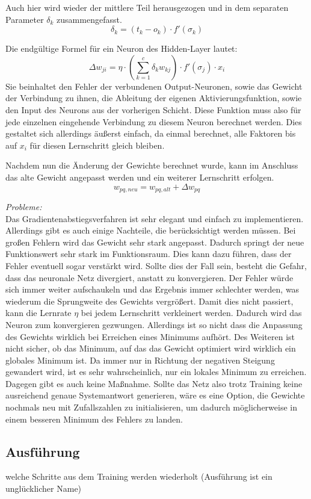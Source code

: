 Auch hier wird wieder der mittlere Teil herausgezogen und in dem separaten Parameter $\delta_k$ zusammengefasst.
\begin{equation}
\delta_k = (t_k-o_k)\cdot f'(\sigma_k)
\end{equation}

Die endgültige Formel für ein Neuron des Hidden-Layer lautet:
\begin{equation}
\Delta w_{ji}=\eta \cdot \left(\sum_{k=1}^{c} \delta_k w_{kj}\right)\cdot f'(\sigma_j)\cdot x_i
\end{equation}
Sie beinhaltet den Fehler der verbundenen Output-Neuronen, sowie das Gewicht der Verbindung zu ihnen, die Ableitung der eigenen Aktivierungsfunktion, sowie den Input des Neurons aus der vorherigen Schicht. Diese Funktion muss also für jede einzelnen eingehende Verbindung zu diesem Neuron berechnet werden. Dies gestaltet sich allerdings äußerst einfach, da einmal berechnet, alle Faktoren bis auf $x_i$ für diesen Lernschritt gleich bleiben.

Nachdem nun die Änderung der Gewichte berechnet wurde, kann im Anschluss das alte Gewicht angepasst werden und ein weiterer Lernschritt erfolgen.
\begin{equation}
w_{pq, neu}=w_{pq, alt}+\Delta w_{pq}
\end{equation}

\emph{Probleme:}
\\Das Gradientenabstiegsverfahren ist sehr elegant und einfach zu implementieren. Allerdings gibt es auch einige Nachteile, die berücksichtigt werden müssen. Bei großen Fehlern wird das Gewicht sehr stark angepasst. Dadurch springt der neue Funktionswert sehr stark im Funktionsraum. Dies kann dazu führen, dass der Fehler eventuell sogar verstärkt wird. Sollte dies der Fall sein, besteht die Gefahr, dass das neuronale Netz divergiert, anstatt zu konvergieren. Der Fehler würde sich immer weiter aufschaukeln und das Ergebnis immer schlechter werden, was wiederum die Sprungweite des Gewichts vergrößert. Damit dies nicht passiert, kann die Lernrate $\eta$ bei jedem Lernschritt verkleinert werden. Dadurch wird das Neuron zum konvergieren gezwungen. Allerdings ist so nicht dass die Anpassung des Gewichts wirklich bei Erreichen eines Minimums aufhört. 
Des Weiteren ist nicht sicher, ob das Minimum, auf das das Gewicht optimiert wird wirklich ein globales Minimum ist. Da immer nur in Richtung der negativen Steigung gewandert wird, ist es sehr wahrscheinlich, nur ein lokales Minimum zu erreichen. Dagegen gibt es auch keine Maßnahme. Sollte das Netz also trotz Training keine ausreichend genaue Systemantwort generieren, wäre es eine Option, die Gewichte nochmals neu mit Zufallszahlen zu initialisieren, um dadurch möglicherweise in einem besseren Minimum des Fehlers zu landen.




\subsection{Ausführung}
welche Schritte aus dem Training werden wiederholt
(Ausführung ist ein unglücklicher Name)